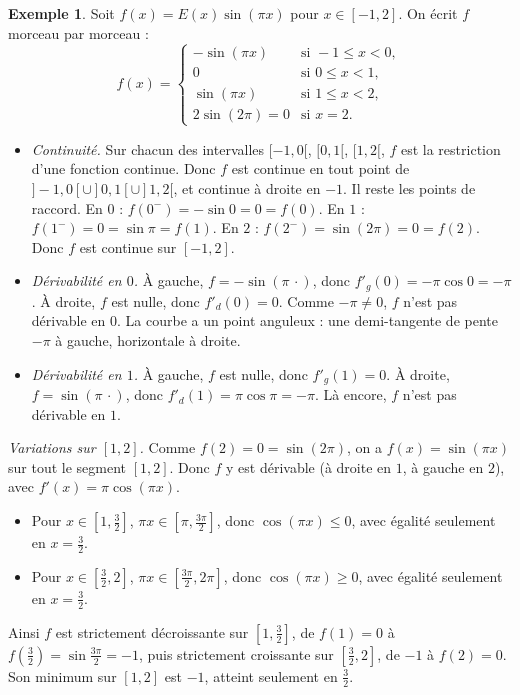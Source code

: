 \documentclass[11pt,a4paper]{article}
\theoremstyle{plain}
\theoremstyle{definition}
\newtheorem{exemple}[theoreme]{Exemple}
\theoremstyle{remark}
\newcommand{\1}{\mathbf{1}}
\begin{document}
\begin{exemple}\label{ex:origine}
Soit $f(x)=E(x)\sin(\pi x)$ pour $x\in[-1,2]$. On écrit $f$ morceau par morceau :
\[
  f(x)=\begin{cases}
    -\sin(\pi x) & \text{si } -1\leq x<0,\\
    0 & \text{si } 0\leq x<1,\\
    \sin(\pi x) & \text{si } 1\leq x<2,\\
    2\sin(2\pi)=0 & \text{si } x=2.
  \end{cases}
\]
\begin{itemize}[nosep]
\item \emph{Continuité.} Sur chacun des intervalles $[-1,0[$, $[0,1[$, $[1,2[$, $f$ est la restriction d'une fonction continue. Donc $f$ est continue en tout point de $]-1,0[\cup]0,1[\cup]1,2[$, et continue à droite en $-1$. Il reste les points de raccord. En $0$ : $f(0^-)=-\sin0=0=f(0)$. En $1$ : $f(1^-)=0=\sin\pi=f(1)$. En $2$ : $f(2^-)=\sin(2\pi)=0=f(2)$. Donc $f$ est continue sur $[-1,2]$.
\item \emph{Dérivabilité en $0$.} À gauche, $f=-\sin(\pi\,\cdot)$, donc $f'_g(0)=-\pi\cos0=-\pi$. À droite, $f$ est nulle, donc $f'_d(0)=0$. Comme $-\pi\neq0$, $f$ n'est pas dérivable en $0$. La courbe a un point anguleux : une demi-tangente de pente $-\pi$ à gauche, horizontale à droite.
\item \emph{Dérivabilité en $1$.} À gauche, $f$ est nulle, donc $f'_g(1)=0$. À droite, $f=\sin(\pi\,\cdot)$, donc $f'_d(1)=\pi\cos\pi=-\pi$. Là encore, $f$ n'est pas dérivable en $1$.
\end{itemize}
\emph{Variations sur $[1,2]$.} Comme $f(2)=0=\sin(2\pi)$, on a $f(x)=\sin(\pi x)$ sur tout le segment $[1,2]$. Donc $f$ y est dérivable (à droite en $1$, à gauche en $2$), avec $f'(x)=\pi\cos(\pi x)$.
\begin{itemize}[nosep]
\item Pour $x\in[1,\tfrac32]$, $\pi x\in[\pi,\tfrac{3\pi}2]$, donc $\cos(\pi x)\leq0$, avec égalité seulement en $x=\tfrac32$.
\item Pour $x\in[\tfrac32,2]$, $\pi x\in[\tfrac{3\pi}2,2\pi]$, donc $\cos(\pi x)\geq0$, avec égalité seulement en $x=\tfrac32$.
\end{itemize}
Ainsi $f$ est strictement décroissante sur $[1,\tfrac32]$, de $f(1)=0$ à $f(\tfrac32)=\sin\tfrac{3\pi}2=-1$, puis strictement croissante sur $[\tfrac32,2]$, de $-1$ à $f(2)=0$. Son minimum sur $[1,2]$ est $-1$, atteint seulement en $\tfrac32$.
\end{exemple}
\end{document}
